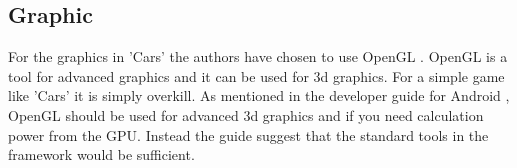 \subsection{Graphic}
For the graphics in 'Cars' the authors have chosen to use OpenGL \cite{opengl}.
OpenGL is a tool for advanced graphics and it can be used for 3d graphics.
For a simple game like 'Cars' it is simply overkill.
As mentioned in the developer guide for Android \cite{android_opengl}, OpenGL should be used for advanced 3d graphics and if you need calculation power from the GPU.
Instead the guide suggest that the standard tools in the framework would be sufficient.
